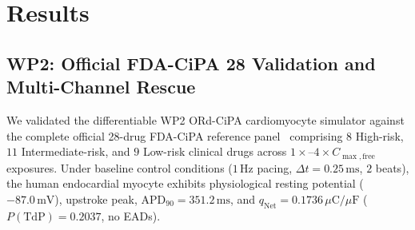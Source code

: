 \documentclass[10pt,twocolumn,letterpaper]{article}
\newcommand{\qnet}{q_{\mathrm{Net}}}
\newcommand{\cmax}{C_{\max,\mathrm{free}}}
\newcommand{\apd}{\mathrm{APD}_{90}}
\begin{document}
\section{Results}
\label{sec:results}

\subsection{WP2: Official FDA-CiPA 28 Validation and Multi-Channel Rescue}
\label{sec:res_wp2}

We validated the differentiable WP2 ORd-CiPA cardiomyocyte simulator against the complete official 28-drug FDA-CiPA reference panel~\cite{colatsky2016comprehensive,crumb2016evaluation,li2019assessment} comprising $8$ High-risk, $11$ Intermediate-risk, and $9$ Low-risk clinical drugs across $1\times$--$4\times\cmax$ exposures. Under baseline control conditions ($1\,\mathrm{Hz}$ pacing, $\Delta t = 0.25\,\mathrm{ms}$, $2$ beats), the human endocardial myocyte exhibits physiological resting potential ($-87.0\,\mathrm{mV}$), upstroke peak, $\apd = 351.2\,\mathrm{ms}$, and $\qnet = 0.1736\,\mu\mathrm{C}/\mu\mathrm{F}$ ($P(\mathrm{TdP}) = 0.2037$, no EADs).
\end{document}

